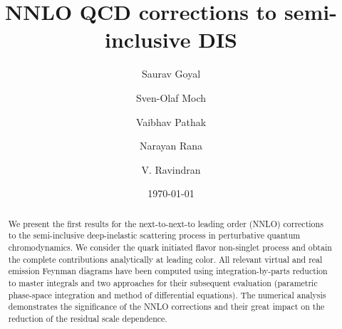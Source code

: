 \documentclass[%
 twocolumn,
 superscriptaddress,
 preprintnumbers,
 nofootinbib,
 amsmath,amssymb,
 aps,
 prl,
]{revtex4}
\begin{document}

\title{NNLO QCD corrections to semi-inclusive DIS}

\author{Saurav Goyal}
\author{Sven-Olaf Moch}
\author{Vaibhav Pathak}
\author{Narayan Rana}
\author{V. Ravindran}



\date{\today}

\begin{abstract}
 We present the first results for the next-to-next-to leading order (NNLO) corrections to the semi-inclusive deep-inelastic scattering process in perturbative quantum chromodynamics. 
 We consider the quark initiated flavor non-singlet process and obtain the complete contributions analytically at leading color.
 All relevant virtual and real emission Feynman diagrams have been computed  
 using integration-by-parts reduction to master integrals
 and two approaches for their subsequent evaluation (parametric phase-space integration and method of differential equations).
 The numerical analysis demonstrates the significance of the NNLO corrections and their great impact on the reduction of the residual scale dependence.
\end{abstract}

\pacs{}%

\maketitle
\end{document}
